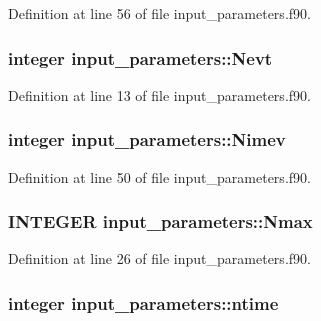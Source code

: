 Definition at line 56 of file input\_\-parameters.f90.

\hypertarget{namespaceinput__parameters_a3db2ebb8fcd24f403d0c3bd05a38e4c2}{
\subsubsection[{Nevt}]{\setlength{\rightskip}{0pt plus 5cm}integer {\bf input\_\-parameters::Nevt}}}
\label{namespaceinput__parameters_a3db2ebb8fcd24f403d0c3bd05a38e4c2}


Definition at line 13 of file input\_\-parameters.f90.

\hypertarget{namespaceinput__parameters_ac0212885e38ab22a77411b20bec16420}{
\subsubsection[{Nimev}]{\setlength{\rightskip}{0pt plus 5cm}integer {\bf input\_\-parameters::Nimev}}}
\label{namespaceinput__parameters_ac0212885e38ab22a77411b20bec16420}


Definition at line 50 of file input\_\-parameters.f90.

\hypertarget{namespaceinput__parameters_a29545f09a06c5a3def5df7fdb5f966ab}{
\subsubsection[{Nmax}]{\setlength{\rightskip}{0pt plus 5cm}INTEGER {\bf input\_\-parameters::Nmax}}}
\label{namespaceinput__parameters_a29545f09a06c5a3def5df7fdb5f966ab}


Definition at line 26 of file input\_\-parameters.f90.

\hypertarget{namespaceinput__parameters_a0c5bab2cbe910c8543c442cb9be582d0}{
\subsubsection[{ntime}]{\setlength{\rightskip}{0pt plus 5cm}integer {\bf input\_\-parameters::ntime}}}
\label{namespaceinput__parameters_a0c5bab2cbe910c8543c442cb9be582d0}


